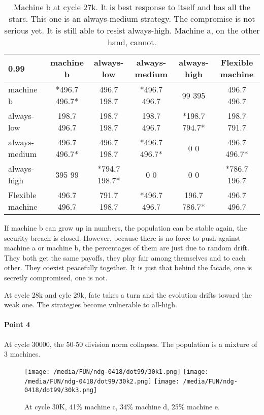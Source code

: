 \documentclass[12.5pt]{report}
\begin{document}
\begin{table}[h!]
\center
\begin{tabular}{l|ccccc}
\textbf{0.99}& machine b & always-low & always-medium & always-high & Flexible machine\\
\hline

machine b & *496.7 496.7*  &  496.7 198.7  & *496.7 496.7  &  99 395 &  496.7 496.7  \\
always-low  &  198.7 496.7  &  198.7 198.7  &  198.7 496.7 &  *198.7 794.7* &  198.7 791.7  \\
always-medium   & 496.7 496.7*  & 496.7 198.7 &  *496.7 496.7*  &     0 0   &     496.7 496.7* \\
always-high   & 395 99  & *794.7 198.7*   &    0 0     &       0 0   &    *786.7 196.7  \\
Flexible machine   & 496.7 496.7 &   791.7 198.7 &  *496.7 496.7  &  196.7 786.7*  & 496.7 496.7 \\

\end{tabular}
\caption{Machine b at cycle 27k. It is best response to itself and has all the stars. This one is an always-medium strategy. The compromise is not serious yet. It is still able to resist always-high. Machine a, on the other hand, cannot.}
\end{table}

If machine b can grow up in numbers, the population can be stable again, the security breach is closed. However, because there is no force to push against machine a or machine b, the percentages of them are just due to random drift. They both get the same payoffs, they play fair among themselves and to each other. They coexist peacefully together. It is just that behind the facade, one is secretly compromised, one is not.

At cycle 28k and cyle 29k, fate takes a turn and the evolution drifts toward the weak one. The strategies become vulnerable to all-high.

\paragraph{Point 4}

At cycle 30000, the 50-50 division norm collapses. The population is a mixture of 3 machines.

\begin{figure}[h!]
\center
\texttt{[image: /media/FUN/ndg-0418/dot99/30k1.png]}
\texttt{[image: /media/FUN/ndg-0418/dot99/30k2.png]}
\texttt{[image: /media/FUN/ndg-0418/dot99/30k3.png]}
\caption{At cycle 30K, 41\% machine c, 34\% machine d, 25\% machine e.}
\end{figure}
\end{document}

